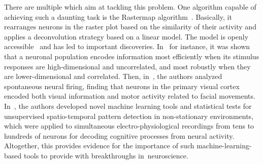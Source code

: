 \documentclass[brainsci, %
               review,accept,pdftex,moreauthors
               ]{Definitions/mdpi}
\begin{document}
There are multiple  which aim at tackling this problem. One algorithm capable of achieving such a daunting task is the Rastermap algorithm~\citep{pachitariu_robustness_2018}. Basically, it rearranges neurons in the raster plot based on the similarity of their activity and applies a deconvolution strategy based on a linear model.  The model is openly accessible~\citep{stringer_mouselandrastermap_2020} and has led to important discoveries. In~\citep{stringer_spontaneous_2019} for instance, it was shown that a neuronal population encodes information most efficiently when its stimulus responses are high-dimensional and uncorrelated, and most robustly when they are lower-dimensional and correlated. Then, in~\citep{stringer_high-precision_2021}, the authors analyzed spontaneous neural firing, finding that neurons in the primary visual cortex encoded both visual information and motor activity related to facial movements. In~\citep{russo_cell_2017}, the authors developed novel machine learning tools and statistical tests for unsupervised spatio-temporal pattern detection in non-stationary environments, which were applied to simultaneous electro-physiological recordings from tens to hundreds of neurons for decoding cognitive processes from neural activity. Altogether, this provides evidence for the importance of such machine-learning-based tools to provide with breakthroughs in~neuroscience.
\end{document}
